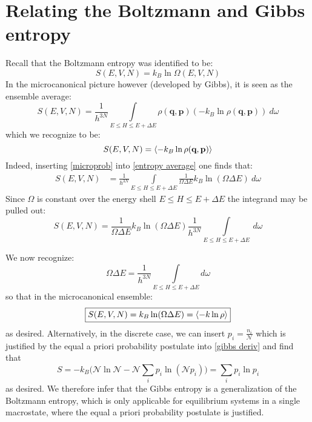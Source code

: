 \documentclass[a4paper,11pt,oneside]{book}
\begin{document}
\section{Relating the Boltzmann and Gibbs entropy}
Recall that the Boltzmann entropy was identified to be:
\begin{equation}
    S(E,V,N) = k_B \ln \Omega(E,V,N)
\end{equation}
In the microcanonical picture however (developed by Gibbs), it is seen as the ensemble average:
\begin{equation}\label{entropy average}
    S(E,V,N) = \frac{1}{h^{3N}} \int \limits_{E\leq H \leq E+\Delta E}  \rho(\textbf{q},\textbf{p})(-k_B \ln \rho(\textbf{q},\textbf{p}))\ d\omega
\end{equation}
which we recognize to be:
\begin{equation}
    S(E,V,N) = \braket{-k_B \ln \rho(\textbf{q},\textbf{p})}
\end{equation}
Indeed, inserting \eqref{microprob} into \eqref{entropy average} one finds that:
\begin{align}
    S(E,V,N) &= \frac{1}{h^{3N}} \int \limits_{E\leq H \leq E+\Delta E} \frac{1}{\Omega \Delta E} k_B \ln (\Omega \Delta E)\  d\omega
\end{align}
Since $\Omega$ is constant over the energy shell $E\leq H \leq E+\Delta E$ the integrand may be pulled out:
\begin{equation}
    S(E,V,N) = \frac{1}{\Omega \Delta E} k_B \ln (\Omega \Delta E) \frac{1}{h^{3N}} \int \limits_{E\leq H \leq E+\Delta E}\ d\omega 
\end{equation}

We now recognize:
\begin{equation}
    \Omega  \Delta E= \frac{1}{h^{3N}} \int \limits_{E\leq H \leq E+\Delta E} d\omega 
\end{equation}
so that in the microcanonical ensemble:
\begin{equation}
   \boxed{ S(E,V,N) = k_B \ln (\Omega \Delta E)= \braket{-k \ln \rho}}
\end{equation}
as desired. Alternatively, in the discrete case, we can insert $p_i=\frac{n_i}{\mathcal{N}}$ which is justified by the equal a priori probability postulate into \eqref{gibbs deriv} and find that
\begin{equation}
    S = -k_B\bigg(\mathcal{N} \ln \mathcal{N} - \mathcal{N}\sum_{i} p_i\ln (\mathcal{N}p_i)\bigg)= \sum_i p_i \ln p_i 
\end{equation}
as desired. We therefore infer that the Gibbs entropy is a generalization of the Boltzmann entropy, which is only applicable for equilibrium systems in a single macrostate, where the equal a priori probability postulate is justified.
\end{document}

